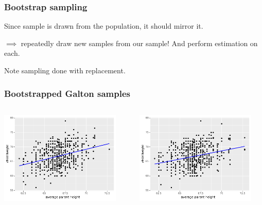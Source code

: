 \documentclass[handout]{beamer}
\begin{document}
\begin{frame}
	\frametitle{Bootstrap sampling}
	
	Since sample is drawn from the population, it should mirror it.
	
	\vspace{0.5cm}
	
	$\implies$ repeatedly draw new samples from our sample! And perform estimation on each.

	\vspace{0.5cm}
	
	Note sampling done with replacement.
	
\end{frame}


\begin{frame}
	\frametitle{Bootstrapped Galton samples}
	
	\begin{columns}
		\begin{column}{0.48\textwidth}
			\includegraphics[width=0.9\textwidth]{../figures/galton_0.pdf}
			\end{column}
			\begin{column}{0.48\textwidth}
				\includegraphics[width=0.9\textwidth]{../figures/galton_1.pdf}
			\end{column}
	\end{columns}
	

\end{frame}
\end{document}
